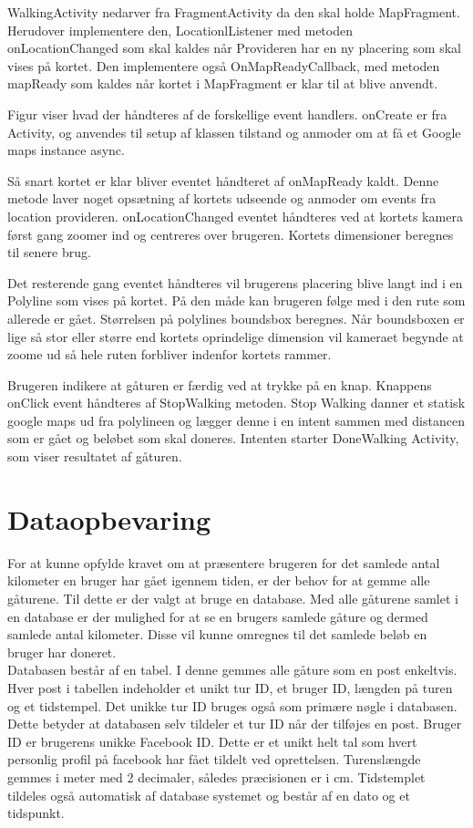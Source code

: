 WalkingActivity nedarver fra FragmentActivity da den skal holde MapFragment. Herudover implementere den, LocationlListener med metoden onLocationChanged som skal kaldes når Provideren har en ny placering som skal vises på kortet. Den implementere også OnMapReadyCallback, med metoden mapReady som kaldes når kortet i MapFragment er klar til at blive anvendt.

Figur  viser hvad der håndteres af de forskellige event handlers. onCreate er fra Activity, og anvendes til setup af klassen tilstand og anmoder om at få et Google maps instance async.

Så snart kortet er klar bliver eventet håndteret af onMapReady kaldt. Denne metode laver noget opsætning af kortets udseende og anmoder om events fra location provideren. onLocationChanged eventet håndteres ved at kortets kamera først gang zoomer ind og centreres over brugeren. Kortets dimensioner beregnes til senere brug.

Det resterende gang eventet håndteres vil brugerens placering blive langt ind i en Polyline som vises på kortet. På den måde kan brugeren følge med i den rute som allerede er gået. Størrelsen på polylines boundsbox beregnes. Når boundsboxen er lige så stor eller større end kortets oprindelige dimension vil kameraet begynde at zoome ud så hele ruten forbliver indenfor kortets rammer.

Brugeren indikere at gåturen er færdig ved at trykke på en knap. Knappens onClick event håndteres af StopWalking metoden. Stop Walking danner et statisk google maps ud fra polylineen og lægger denne i en intent sammen med distancen som er gået og beløbet som skal doneres. Intenten starter DoneWalking Activity, som viser resultatet af gåturen.




\FloatBarrier
\section{Dataopbevaring}
For at kunne opfylde kravet om at præsentere brugeren for det samlede antal kilometer en bruger har gået igennem tiden, er der behov for at gemme alle gåturene. Til dette er der valgt at bruge en database. Med alle gåturene samlet i en database er der mulighed for at se en brugers samlede gåture og dermed samlede antal kilometer. Disse vil kunne omregnes til det samlede beløb en bruger har doneret.\\
Databasen består af en tabel. I denne gemmes alle gåture som en post enkeltvis. Hver post i tabellen indeholder et unikt tur ID, et bruger ID, længden på turen og et tidstempel.
Det unikke tur ID bruges også som primære nøgle i databasen. Dette betyder at databasen selv tildeler et tur ID når der tilføjes en post. Bruger ID er brugerens unikke Facebook ID. Dette er et unikt helt tal som hvert personlig profil på facebook har fået tildelt ved oprettelsen. Turenslængde gemmes i meter med 2 decimaler, således præcisionen er i cm. Tidstemplet tildeles også automatisk af database systemet og består af en dato og et tidspunkt.\\

